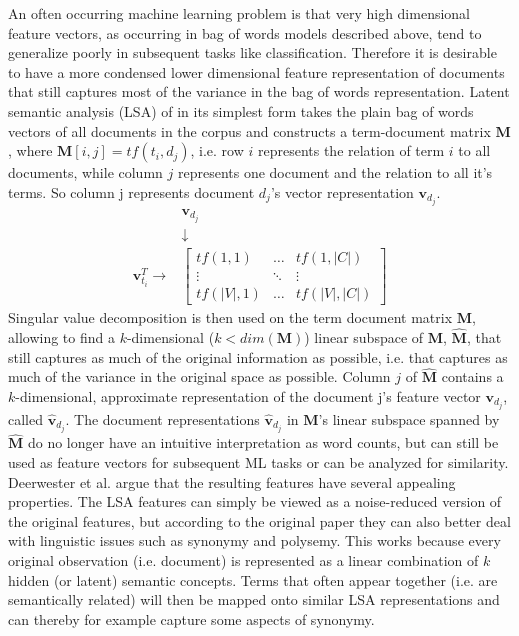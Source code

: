 \documentclass[Thesis.tex]{subfiles}
\begin{document}
An often occurring machine learning problem is that very high dimensional
feature vectors, as occurring in bag of words models described above,
tend to generalize poorly in subsequent tasks like classification.
Therefore it is desirable to have a more condensed lower dimensional
feature representation of documents that still captures most of the
variance in the bag of words representation. Latent semantic analysis
(LSA) of \citet{Deerwester1990} in its simplest form takes the plain bag of words
vectors of all documents in the corpus and constructs a term-document
matrix $\textbf{M}$, where $\textbf{M}[i,j]=tf(t_{i},d_{j})$, i.e. row $i$ represents
the relation of term $i$ to all documents, while column $j$ represents
one document and the relation to all it's terms. So column j represents document $d_j$'s vector representation $\textbf{v}_{d_j}$.
\[ 
\begin{matrix} & \textbf{v}_{d_j}\\
& \downarrow\\
\textbf{v}_{t_i}^{T}\rightarrow & \begin{bmatrix}tf(1,1) & \dots & tf(1,|C|)\\
\vdots & \ddots & \vdots\\
tf(|V|,1) & \dots & tf(|V|,|C|)
\end{bmatrix}
\end{matrix}
\]
Singular value decomposition is then used on the term document matrix
$\textbf{M}$, allowing to find a $k$-dimensional ($k<dim(\textbf{M})$) linear subspace
of $\textbf{M}$, $\hat{\textbf{M}}$, that still captures as much of the original information
as possible, i.e. that captures as much of the variance in the original
space as possible. Column $j$ of $\hat{\textbf{M}}$ contains a $k$-dimensional,
approximate representation of the document j's feature vector $\textbf{v}_{d_{j}}$, called $\hat{\textbf{v}}_{d_{j}}$.
The document representations $\hat{\textbf{v}}_{d_j}$ in $\textbf{M}$'s linear subspace
spanned by $\hat{\textbf{M}}$ do no longer have an intuitive interpretation
as word counts, but can still be used as feature vectors for subsequent
ML tasks or can be analyzed for similarity. Deerwester et al. argue
that the resulting features have several appealing properties. The
LSA features can simply be viewed as a noise-reduced version of the
original features, but according to the original paper they can also
better deal with linguistic issues such as synonymy and polysemy.
This works because every original observation (i.e. document) is represented
as a linear combination of $k$ hidden (or latent) semantic concepts.
Terms that often appear together (i.e. are semantically related) will
then be mapped onto similar LSA representations and can thereby for
example capture some aspects of synonymy.
\end{document}
